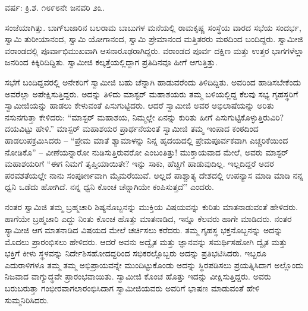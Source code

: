 \begin{center}
ವರ್ಷ: ಕ್ರಿ.ಶ. ೧೮೯೮ನೇ ಜನವರಿ ೨೩.
\end{center}

ಸಂಜೆಯಾಗಿತ್ತು. ಬಾಗ್‌ಬಜಾರಿನ ಬಲರಾಮ ಬಾಬುಗಳ ಮನೆಯಲ್ಲಿ ರಾಮಕೃಷ್ಣ ಸಂಸ್ಥೆಯ ವಾರದ ಸಭೆಯ ಸಂದರ್ಭ, ಸ್ವಾಮಿ ತುರೀಯಾನಂದ, ಸ್ವಾಮಿ ಯೋಗಾನಂದ, ಸ್ವಾಮಿ ಪ್ರೇಮಾನಂದ ಮತ್ತಿತರರು ಮಠದಿಂದ ಬಂದಿದ್ದರು. ಸ್ವಾಮೀಜಿ ವರಾಂಡದಲ್ಲಿ ಪೂರ್ವಾಭಿಮುಖವಾಗಿ ಆಸನಾರೂಢರಾಗಿದ್ದರು. ವರಾಂಡದ ಪೂರ್ವ ದಕ್ಷಿಣ ಮತ್ತು ಉತ್ತರ ಭಾಗಗಳೆಲ್ಲಾ ಜನರಿಂದ ಕಿಕ್ಕಿರಿದಿದ್ದಿತು. ಸ್ವಾಮೀಜಿ ಕಲ್ಕತ್ತೆಯಲ್ಲಿದ್ದಾಗ ಪ್ರತಿದಿನವೂ ಹೀಗೆ ಆಗುತ್ತಿತ್ತು.

ಸಭೆಗೆ ಬಂದಿದ್ದವರಲ್ಲಿ ಅನೇಕರಿಗೆ ಸ್ವಾಮೀಜಿ ಬಹು ಚೆನ್ನಾಗಿ ಹಾಡುವರೆಂದು ತಿಳಿದಿದ್ದಿತು. ಅವರಿಂದ ಹಾಡಿಸಬೇಕೆಂದು ಅವರೆಲ್ಲಾ ಅಪೇಕ್ಷಿಸುತ್ತಿದ್ದರು. ಅದನ್ನು ತಿಳಿದು ಮಾಸ್ಟರ್ ಮಹಾಶಯರು ತಮ್ಮ ಬಳಿಯಲ್ಲಿದ್ದ ಕೆಲವು ಸಭ್ಯ ಗೃಹಸ್ಥರಿಗೆ ಸ್ವಾಮೀಜಿಯನ್ನು ಹಾಡಲು ಕೇಳುವಂತೆ ಪಿಸುಗುಟ್ಟಿದರು. ಆದರೆ ಸ್ವಾಮೀಜಿ ಅವರ ಅಭಿಲಾಷೆಯನ್ನು ಅರಿತು ನಸುನಗುತ್ತಾ ಕೇಳಿದರು: “ಮಾಸ್ಟರ್ ಮಹಾಶಯ, ನಿಮ್ಮಲ್ಲೇ ಏನನ್ನು ಕುರಿತು ಹೀಗೆ ಪಿಸುಗುಟ್ಟಿಕೊಳ್ಳುತ್ತಿರುವಿರಿ? ದಯವಿಟ್ಟು ಹೇಳಿ.” ಮಾಸ್ಟರ್ ಮಹಾಶಯರ ಪ್ರಾರ್ಥನೆಯಂತೆ ಸ್ವಾಮೀಜಿ ತಮ್ಮ ಇಂಪಾದ ಕಂಠದಿಂದ ಹಾಡಲುಪಕ್ರಮಿಸಿದರು – “ಪ್ರೇಮ ಮಾತೆ ಶ್ಯಾಮಾಳನ್ನು ನಿನ್ನ ಹೃದಯದಲ್ಲಿ ಪ್ರೇಮಪೂರ್ವಕವಾಗಿ ಎಚ್ಚರಿಕೆಯಿಂದ ನೋಡಿಕೊ” – ವೀಣೆಯನ್ನಾರೋ ನುಡಿಸುತ್ತಿರುವರೋ ಎಂಬಂತಿತ್ತು! ಮುಕ್ತಾಯವಾದ ಮೇಲೆ, ಅವರು ಮಾಸ್ಟರ್ ಮಹಾಶಯರಿಗೆ “ಈಗ ನಿಮಗೆ ತೃಪ್ತಿಯಾಯಿತೇ? ಇನ್ನು ಸಾಕು, ಹೆಚ್ಚಿಗೆ ಹಾಡುವುದಿಲ್ಲ. ಇಲ್ಲದಿದ್ದರೆ ಅದರ ಪರವಶತೆಯಲ್ಲೇ ನಾನು ಸಂಪೂರ್ಣವಾಗಿ ಮೈಮರೆಯುವೆ. ಅಲ್ಲದೆ ಪಾಶ್ಚಾತ್ಯ ದೇಶದಲ್ಲಿ ಉಪನ್ಯಾಸ ಮಾಡಿ ಮಾಡಿ ನನ್ನ ಧ್ವನಿ ಒಡೆದು ಹೋಗಿದೆ. ನನ್ನ ಧ್ವನಿ ಕೊಂಚ ಚೆನ್ನಾಗಿಯೇ ಕಂಪಿಸುತ್ತದೆ” ಎಂದರು.

ನಂತರ ಸ್ವಾಮಿಜಿ ತಮ್ಮ ಬ್ರಹ್ಮಚಾರಿ ಶಿಷ್ಯನೊಬ್ಬನನ್ನು ಮುಕ್ತಿಯ ವಿಷಯವನ್ನು ಕುರಿತು ಮಾತನಾಡುವಂತೆ ಹೇಳಿದರು. ಹಾಗೆಯೇ ಬ್ರಹ್ಮಚಾರಿ ಎದ್ದು ನಿಂತು ಕೊಂಚ ಹೊತ್ತು ಮಾತನಾಡಿದ, ಇನ್ನೂ ಕೆಲವರು ಹಾಗೇ ಮಾಡಿದರು. ನಂತರ ಸ್ಯಾಮೀಜಿ ಆಗ ಮಾತನಾಡಿದ ವಿಷಯದ ಮೇಲೆ ಚರ್ಚಿಸಲು ಕರೆದರು. ತಮ್ಮ ಗೃಹಸ್ಥ ಭಕ್ತನೊಬ್ಬನನ್ನು ಅದನ್ನು ಮೊದಲು ಪ್ರಾರಂಭಿಸಲು ಹೇಳಿದರು. ಆದರೆ ಅವನು ಅದ್ವೈತ ಮತ್ತು ಜ್ಞಾನವನ್ನು ಸಮರ್ಥಿಸಹೋಗಿ ದ್ವೈತ ಮತ್ತು ಭಕ್ತಿಗೆ ಕೀಳು ಸ್ಥಳವನ್ನು ನಿರ್ದೇಶಿಸಹೋದದ್ದರಿಂದ ಸಭಿಕರಲ್ಲೊಬ್ಬರು ಅದನ್ನು ಪ್ರತಿಭಟಿಸಿದರು. ಇಬ್ಬರೂ ಎದುರಾಳಿಗಳೂ ತಮ್ಮ ತಮ್ಮ ಅಭಿಪ್ರಾಯವನ್ನೇ ಮುಂದಿಟ್ಟುಕೊಂಡು ಅದನ್ನು ಸ್ಥಿರಪಡಿಸಲು ಪ್ರಯತ್ನಿಸಿದಾಗ ಅಲ್ಲೊಂದು ನಿಜವಾದ ವಾಗ್ಯುದ್ಧವೇ ಪ್ರಾರಂಭವಾಯಿತು. ಸ್ವಾಮೀಜಿ ಕೊಂಚ ಹೊತ್ತು ಇದನ್ನು ವೀಕ್ಷಿಸುತ್ತಿದ್ದರು. ಅವರು ಬರುಬರುತ್ತಾ ಗಂಭೀರವಾಗಲಾರಂಭಿಸಿದಾಗ ಸ್ವಾಮೀಜಿಯವರು ಅವರಿಗೆ ಭಾಷಣ ಮಾಡುವಂತೆ ಹೇಳಿ ಸುಮ್ಮನಿರಿಸಿದರು.

